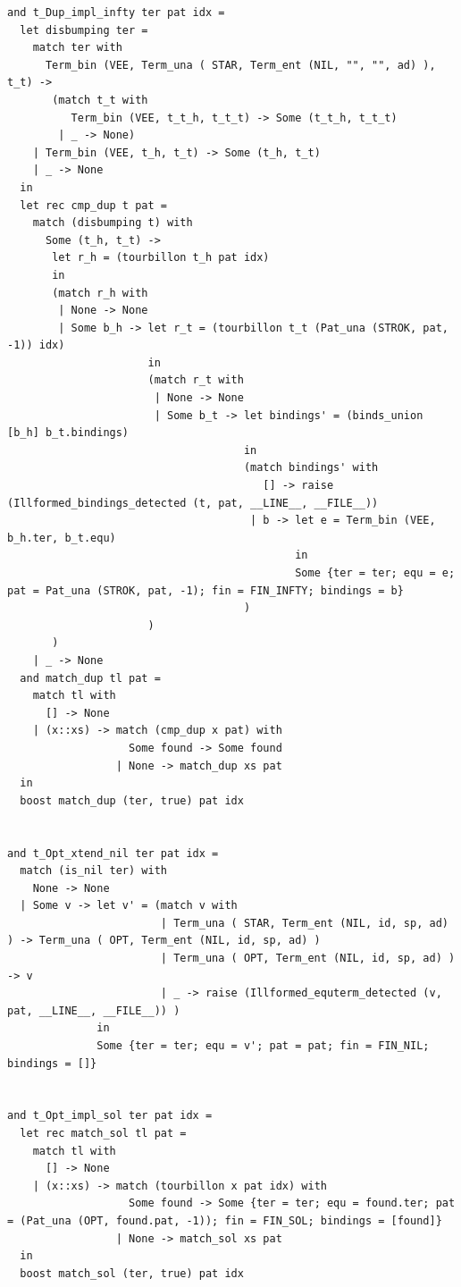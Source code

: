 \documentclass[12pt]{article}
\begin{document}
\begin{tiny}
\begin{verbatim}
and t_Dup_impl_infty ter pat idx =
  let disbumping ter =
    match ter with
      Term_bin (VEE, Term_una ( STAR, Term_ent (NIL, "", "", ad) ), t_t) ->
       (match t_t with
          Term_bin (VEE, t_t_h, t_t_t) -> Some (t_t_h, t_t_t)
        | _ -> None)
    | Term_bin (VEE, t_h, t_t) -> Some (t_h, t_t)
    | _ -> None
  in
  let rec cmp_dup t pat =
    match (disbumping t) with
      Some (t_h, t_t) ->
       let r_h = (tourbillon t_h pat idx)
       in
       (match r_h with
        | None -> None
        | Some b_h -> let r_t = (tourbillon t_t (Pat_una (STROK, pat, -1)) idx)
                      in
                      (match r_t with
                       | None -> None
                       | Some b_t -> let bindings' = (binds_union [b_h] b_t.bindings)
                                     in
                                     (match bindings' with
                                        [] -> raise (Illformed_bindings_detected (t, pat, __LINE__, __FILE__))
                                      | b -> let e = Term_bin (VEE, b_h.ter, b_t.equ)
                                             in
                                             Some {ter = ter; equ = e; pat = Pat_una (STROK, pat, -1); fin = FIN_INFTY; bindings = b}
                                     )
                      )
       )
    | _ -> None
  and match_dup tl pat =
    match tl with
      [] -> None
    | (x::xs) -> match (cmp_dup x pat) with
                   Some found -> Some found
                 | None -> match_dup xs pat
  in
  boost match_dup (ter, true) pat idx


and t_Opt_xtend_nil ter pat idx =
  match (is_nil ter) with
    None -> None
  | Some v -> let v' = (match v with
                        | Term_una ( STAR, Term_ent (NIL, id, sp, ad) ) -> Term_una ( OPT, Term_ent (NIL, id, sp, ad) )
                        | Term_una ( OPT, Term_ent (NIL, id, sp, ad) ) -> v
                        | _ -> raise (Illformed_equterm_detected (v, pat, __LINE__, __FILE__)) )
              in
              Some {ter = ter; equ = v'; pat = pat; fin = FIN_NIL; bindings = []}


and t_Opt_impl_sol ter pat idx =
  let rec match_sol tl pat =
    match tl with
      [] -> None
    | (x::xs) -> match (tourbillon x pat idx) with
                   Some found -> Some {ter = ter; equ = found.ter; pat = (Pat_una (OPT, found.pat, -1)); fin = FIN_SOL; bindings = [found]}
                 | None -> match_sol xs pat
  in
  boost match_sol (ter, true) pat idx



\end{verbatim}
\end{tiny}
\end{document}
